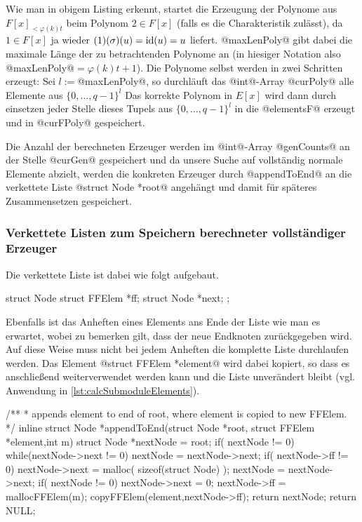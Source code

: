 Wie man in obigem Listing erkennt, startet die Erzeugung der Polynome aus 
$F[x]_{<\varphi(k)t}$ beim Polynom $2 \in F[x]$ (falls es die Charakteristik
zulässt), da $1\in F[x]$ ja wieder $(1)(\sigma)(u) = \operatorname{id}(u) = u$ liefert.
@maxLenPoly@ gibt dabei die maximale Länge der zu betrachtenden Polynome an (in
hiesiger Notation also @maxLenPoly@$= \varphi(k)t+1$). Die Polynome selbst
werden in zwei Schritten erzeugt: Sei $l := $@maxLenPoly@, so
durchläuft das @int@-Array @curPoly@ alle Elemente aus $\{0,\ldots,q-1\}^l$
Das korrekte Polynom in $E[x]$ wird dann durch einsetzen jeder Stelle 
dieses Tupels aus $\{0,\ldots,q-1\}^l$ in die @elementsF@ erzeugt und in 
@curFPoly@ gespeichert.

Die Anzahl der berechneten Erzeuger werden im @int@-Array @genCounts@ an der
Stelle @curGen@ gespeichert und da unsere Suche auf vollständig normale
Elemente abzielt, werden die konkreten Erzeuger durch @appendToEnd@ 
an die verkettete Liste @struct Node *root@ angehängt und 
damit für späteres Zusammensetzen gespeichert.


\subsubsection{Verkettete Listen zum Speichern berechneter vollständiger 
Erzeuger}
\label{subsub:verkettete_listen}

Die verkettete Liste ist dabei wie folgt aufgebaut.

\begin{ccode}[caption={Aus \url{../Sage/enumeratePCNs.c}},
  label=lst:structNode]
struct Node {
    struct FFElem *ff;
    struct Node *next;
};
\end{ccode}

Ebenfalls ist das Anheften eines Elements ans Ende der Liste wie man es
erwartet, wobei zu bemerken gilt, dass der neue Endknoten zurückgegeben wird.
Auf diese Weise muss nicht bei jedem Anheften die komplette Liste durchlaufen
werden. Das Element @struct FFElem *element@ wird dabei kopiert, so dass es
anschließend weiterverwendet werden kann und die Liste unverändert bleibt 
(vgl. Anwendung in \autoref{lst:calcSubmoduleElements}).

\begin{ccode}[caption={Aus \url{../Sage/enumeratePCNs.c}},
  label=lst:appendToEnd]
/**
 * appends element to end of root, where element is copied to new FFElem.
 */
inline struct Node *appendToEnd(struct Node *root, struct FFElem *element,int m){
    struct Node *nextNode = root;
    if( nextNode != 0){
        while(nextNode->next != 0){
            nextNode = nextNode->next;
        }
        if( nextNode->ff != 0){
            nextNode->next = malloc( sizeof(struct Node) );
            nextNode = nextNode->next;
        }
        if( nextNode != 0){
            nextNode->next = 0;
            nextNode->ff = mallocFFElem(m);
            copyFFElem(element,nextNode->ff);
            return nextNode;
        }
    }
    return NULL;
}
\end{ccode}


